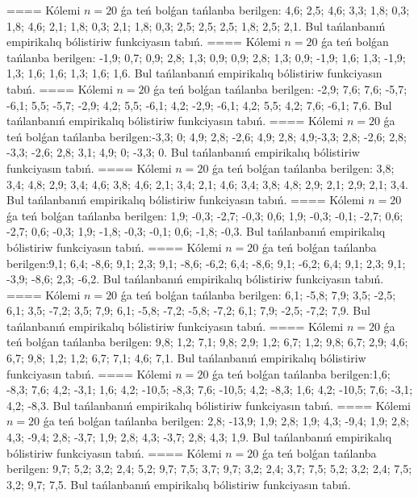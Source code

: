 ====
Kólemi \(n = 20\) ǵa teń bolǵan tańlanba berilgen: 4,6; 2,5; 4,6; 3,3; 1,8; 0,3; 1,8; 4,6; 2,1; 1,8; 0,3; 2,1; 1,8; 0,3; 2,5; 2,5; 2,5; 1,8; 2,5; 2,1. Bul tańlanbanıń empirikalıq bólistiriw funkciyasın tabıń.
====
Kólemi \(n = 20\) ǵa teń bolǵan tańlanba berilgen: -1,9; 0,7; 0,9; 2,8; 1,3; 0,9; 0,9; 2,8; 1,3; 0,9; -1,9; 1,6; 1,3; -1,9; 1,3; 1,6; 1,6; 1,3; 1,6; 1,6. Bul tańlanbanıń empirikalıq bólistiriw funkciyasın tabıń.
====
Kólemi \(n = 20\) ǵa teń bolǵan tańlanba berilgen: -2,9; 7,6; 7,6; -5,7; -6,1; 5,5; -5,7; -2,9; 4,2; 5,5; -6,1; 4,2; -2,9; -6,1; 4,2; 5,5; 4,2; 7,6; -6,1; 7,6. Bul tańlanbanıń empirikalıq bólistiriw funkciyasın tabıń.
====
Kólemi \(n = 20\) ǵa teń bolǵan tańlanba berilgen:-3,3; 0; 4,9; 2,8; -2,6; 4,9; 2,8; 4,9;-3,3; 2,8; -2,6; 2,8; -3,3; -2,6; 2,8; 3,1; 4,9; 0; -3,3; 0. Bul tańlanbanıń empirikalıq bólistiriw funkciyasın tabıń.
====
Kólemi \(n = 20\) ǵa teń bolǵan tańlanba berilgen: 3,8; 3,4; 4,8; 2,9; 3,4; 4,6; 3,8; 4,6; 2,1; 3,4; 2,1; 4,6; 3,4; 3,8; 4,8; 2,9; 2,1; 2,9; 2,1; 3,4. Bul tańlanbanıń empirikalıq bólistiriw funkciyasın tabıń.
====
Kólemi \(n = 20\) ǵa teń bolǵan tańlanba berilgen: 1,9; -0,3; -2,7; -0,3; 0,6; 1,9; -0,3; -0,1; -2,7; 0,6; -2,7; 0,6; -0,3; 1,9; -1,8; -0,3; -0,1; 0,6; -1,8; -0,3. Bul tańlanbanıń empirikalıq bólistiriw funkciyasın tabıń.
====
Kólemi \(n = 20\) ǵa teń bolǵan tańlanba berilgen:9,1; 6,4; -8,6; 9,1; 2,3; 9,1; -8,6; -6,2; 6,4; -8,6; 9,1; -6,2; 6,4; 9,1; 2,3; 9,1; -3,9; -8,6; 2,3; -6,2. Bul tańlanbanıń empirikalıq bólistiriw funkciyasın tabıń.
====
Kólemi \(n = 20\) ǵa teń bolǵan tańlanba berilgen: 6,1; -5,8; 7,9; 3,5; -2,5; 6,1; 3,5; -7,2; 3,5; 7,9; 6,1; -5,8; -7,2; -5,8; -7,2; 6,1; 7,9; -2,5; -7,2; 7,9. Bul tańlanbanıń empirikalıq bólistiriw funkciyasın tabıń.
====
Kólemi \(n = 20\) ǵa teń bolǵan tańlanba berilgen: 9,8; 1,2; 7,1; 9,8; 2,9; 1,2; 6,7; 1,2; 9,8; 6,7; 2,9; 4,6; 6,7; 9,8; 1,2; 1,2; 6,7; 7,1; 4,6; 7,1. Bul tańlanbanıń empirikalıq bólistiriw funkciyasın tabıń.
====
Kólemi \(n = 20\) ǵa teń bolǵan tańlanba berilgen:1,6; -8,3; 7,6; 4,2; -3,1; 1,6; 4,2; -10,5; -8,3; 7,6; -10,5; 4,2; -8,3; 1,6; 4,2; -10,5; 7,6; -3,1; 4,2; -8,3. Bul tańlanbanıń empirikalıq bólistiriw funkciyasın tabıń.
====
Kólemi \(n = 20\) ǵa teń bolǵan tańlanba berilgen: 2,8; -13,9; 1,9; 2,8; 1,9; 4,3; -9,4; 1,9; 2,8; 4,3; -9,4; 2,8; -3,7; 1,9; 2,8; 4,3; -3,7; 2,8; 4,3; 1,9. Bul tańlanbanıń empirikalıq bólistiriw funkciyasın tabıń.
====
Kólemi \(n = 20\) ǵa teń bolǵan tańlanba berilgen: 9,7; 5,2; 3,2; 2,4; 5,2; 9,7; 7,5; 3,7; 9,7; 3,2; 2,4; 3,7; 7,5; 5,2; 3,2; 2,4; 7,5; 3,2; 9,7; 7,5. Bul tańlanbanıń empirikalıq bólistiriw funkciyasın tabıń.
